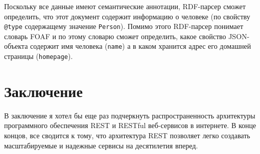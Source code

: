 \documentclass[a4page]{article}
\begin{document}
Поскольку все данные имеют семантические аннотации, RDF-парсер сможет определить,
что этот документ содержит информацию о человеке
(по свойству \texttt{@type} содержащему значение \texttt{Person}).
Помимо этого RDF-парсер понимает словарь FOAF и по этому словарю сможет определить,
какое свойство JSON-объекта содержит имя человека (\texttt{name})
а в каком хранится адрес его домашней страницы (\texttt{homepage}).

\newpage
\section{Заключение}
В заключение я хотел бы еще раз подчеркнуть распространенность архитектуры программного обеспечения REST
и RESTful веб-сервисов в интернете. В конце концов, все сводится к тому,
что архитектура REST позволяет легко создавать масштабируемые и надежные сервисы на десятилетия вперед.

\newpage
{}
\end{document}
